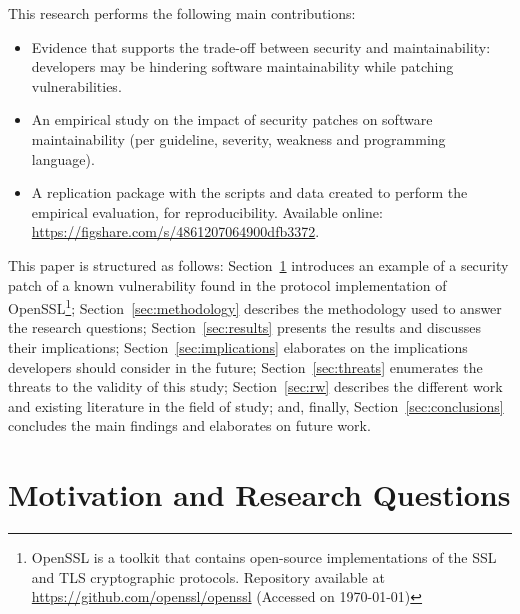 \documentclass[smallextended]{svjour3}       %
\begin{document}
This research performs the following main contributions:
%
\begin{itemize}
	\vspace{-0.3em}
  \item Evidence that supports the trade-off between security and 
  maintainability: developers may be hindering software 
  maintainability while patching vulnerabilities.
	\item An empirical study on the impact of security patches on 
	software maintainability (per guideline, severity, weakness and 
	programming language).
	\item A replication package with the scripts and data created to 
	perform the empirical evaluation, for reproducibility. Available 
	online: \url{https://figshare.com/s/4861207064900dfb3372}.
\end{itemize}
%
This paper is structured as follows: Section~\ref{sec:motivation} 
introduces an example of a security patch of a known vulnerability 
found in the protocol implementation of 
OpenSSL\footnote{\label{openssl}OpenSSL is a toolkit that
contains open-source implementations of the SSL and TLS cryptographic
protocols. Repository available at 
\url{https://github.com/openssl/openssl} (Accessed on \today{})}; 
Section~\ref{sec:methodology} describes the methodology used to 
answer the research questions; Section~\ref{sec:results} presents 
the results and discusses their implications; 
Section~\ref{sec:implications} elaborates on the implications
developers should consider in the future; Section~\ref{sec:threats} 
enumerates the threats to the validity of this study; 
Section~\ref{sec:rw} describes the different work and existing
literature in the field of study; and, finally, 
Section~\ref{sec:conclusions} concludes the main findings and 
elaborates on future work.

\section{Motivation and Research Questions}\label{sec:motivation}
%
\end{document}
